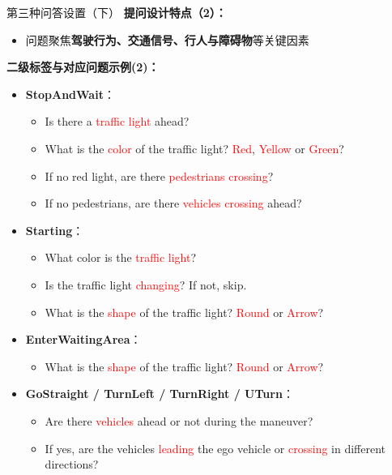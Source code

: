 \documentclass[serif]{beamer}
\begin{document}
\begin{frame}{第三种问答设置（下）}
\scriptsize
\textbf{提问设计特点（2）：}
\begin{itemize}
  \item 问题聚焦\textbf{驾驶行为、交通信号、行人与障碍物}等关键因素
\end{itemize}

\vspace{0.6em}
\textbf{二级标签与对应问题示例(2)：}

\begin{itemize}
  \item \textbf{StopAndWait}：
  \begin{itemize}
    \item Is there a \textcolor{red}{traffic light} ahead?
    \item What is the \textcolor{red}{color} of the traffic light? \textcolor{red}{Red}, \textcolor{red}{Yellow} or \textcolor{red}{Green}?
    \item If no red light, are there \textcolor{red}{pedestrians crossing}?
    \item If no pedestrians, are there \textcolor{red}{vehicles crossing} ahead?
  \end{itemize}

  \item \textbf{Starting}：
  \begin{itemize}
    \item What color is the \textcolor{red}{traffic light}?
    \item Is the traffic light \textcolor{red}{changing}? If not, skip.
    \item What is the \textcolor{red}{shape} of the traffic light? \textcolor{red}{Round} or \textcolor{red}{Arrow}?
  \end{itemize}

  \item \textbf{EnterWaitingArea}：
  \begin{itemize}
    \item What is the \textcolor{red}{shape} of the traffic light? \textcolor{red}{Round} or \textcolor{red}{Arrow}?
  \end{itemize}

  \item \textbf{GoStraight / TurnLeft / TurnRight / UTurn}：
  \begin{itemize}
    \item Are there \textcolor{red}{vehicles} ahead or not during the maneuver?
    \item If yes, are the vehicles \textcolor{red}{leading} the ego vehicle or \textcolor{red}{crossing} in different directions?
  \end{itemize}
\end{itemize}
\normalsize
\end{frame}
\end{document}
